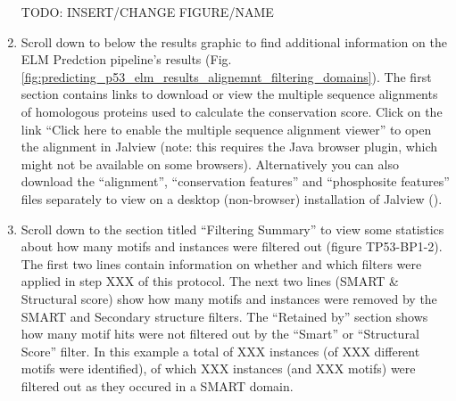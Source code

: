 \begin{enumerate}
TODO: INSERT/CHANGE FIGURE/NAME

\item Scroll down to below the results graphic to find additional information
	on the ELM Predction pipeline's results
	(Fig. \ref{fig:predicting_p53_elm_results_alignemnt_filtering_domains}).
	The first
	section contains links to download or view the multiple sequence
	alignments of homologous proteins used to calculate the conservation
	score. Click on the link ``Click here to enable the multiple sequence
	alignment viewer'' to open the alignment in Jalview (note: this
	requires the Java browser plugin, which might not be available on some
	browsers). Alternatively you can also download the ``alignment'',
	``conservation features'' and ``phosphosite features'' files separately
	to view on a desktop (non-browser) installation of Jalview
	(\cite{19151095}).


\item Scroll down to the section titled ``Filtering Summary'' to view some
	statistics about how many motifs and instances were filtered out
	(figure TP53-BP1-2). The first two lines contain information on whether
	and which filters were applied in step XXX of this protocol. The next
	two lines (SMART \& Structural score) show how many motifs and
	instances were removed by the SMART and Secondary structure filters.
	The ``Retained by'' section shows how many motif hits were not filtered
	out by the ``Smart'' or ``Structural Score'' filter. In this example a
	total of XXX instances (of XXX different motifs were identified), of
	which XXX instances (and XXX motifs) were filtered out as they occured
	in a SMART domain.



\end{enumerate}
